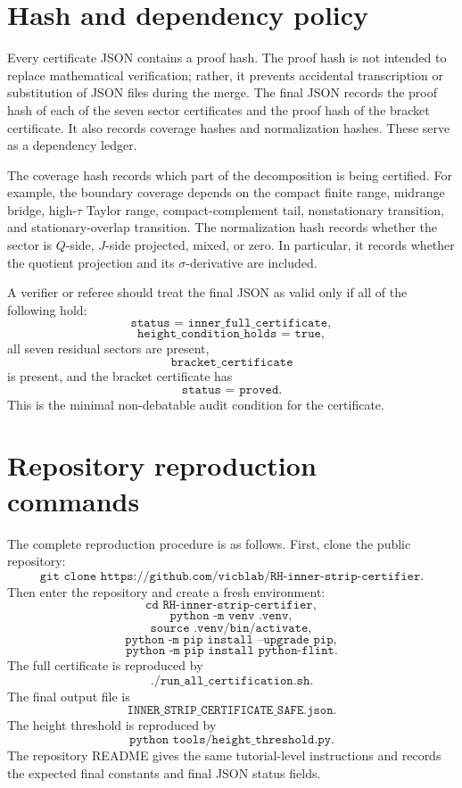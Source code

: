 \documentclass[11pt]{article}
\newcommand{\sig}{\sigma}
\newcommand{\tauh}{\tau}
\newcommand{\JSON}[1]{\texttt{#1}}
\newcommand{\code}[1]{\texttt{#1}}
\begin{document}
\section{Hash and dependency policy}

Every certificate JSON contains a proof hash.  The proof hash is not intended
to replace mathematical verification; rather, it prevents accidental
transcription or substitution of JSON files during the merge.  The final JSON
records the proof hash of each of the seven sector certificates and the proof
hash of the bracket certificate.  It also records coverage hashes and
normalization hashes.  These serve as a dependency ledger.

The coverage hash records which part of the decomposition is being certified.
For example, the boundary coverage depends on the compact finite range,
midrange bridge, high-\(\tauh\) Taylor range, compact-complement tail,
nonstationary transition, and stationary-overlap transition.  The normalization
hash records whether the sector is \(Q\)-side, \(J\)-side projected, mixed, or
zero.  In particular, it records whether the quotient projection and its
\(\sig\)-derivative are included.

A verifier or referee should treat the final JSON as valid only if all of the
following hold:
\[
        \JSON{status = inner\_full\_certificate},
\]
\[
        \JSON{height\_condition\_holds = true},
\]
all seven residual sectors are present,
\[
        \JSON{bracket\_certificate}
\]
is present, and the bracket certificate has
\[
        \JSON{status = proved}.
\]
This is the minimal non-debatable audit condition for the certificate.

\section{Repository reproduction commands}

The complete reproduction procedure is as follows.  First, clone the public
repository:
\[
        \code{git clone https://github.com/vicblab/RH-inner-strip-certifier}.
\]
Then enter the repository and create a fresh environment:
\[
        \code{cd RH-inner-strip-certifier},
\]
\[
        \code{python -m venv .venv},
\]
\[
        \code{source .venv/bin/activate},
\]
\[
        \code{python -m pip install --upgrade pip},
\]
\[
        \code{python -m pip install python-flint}.
\]
The full certificate is reproduced by
\[
        \code{./run\_all\_certification.sh}.
\]
The final output file is
\[
        \code{INNER\_STRIP\_CERTIFICATE\_SAFE.json}.
\]
The height threshold is reproduced by
\[
        \code{python tools/height\_threshold.py}.
\]
The repository README gives the same tutorial-level instructions and records
the expected final constants and final JSON status fields. \cite{InnerRepo}
\end{document}
